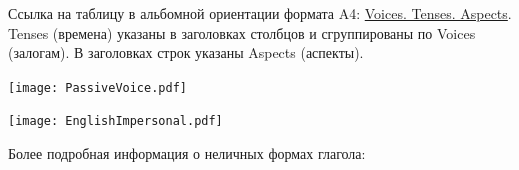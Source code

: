 \documentclass[main.tex]{subfiles}
\begin{document}
Ссылка на таблицу в альбомной ориентации формата A4: \href{https://mualal.github.io/asp/english/EnglishTensesAspectsVoicesPoster.pdf}{Voices. Tenses. Aspects}.
Tenses (времена) указаны в заголовках столбцов и сгруппированы по Voices (залогам).
В заголовках строк указаны Aspects (аспекты).


{\parindent-10pt\texttt{[image: PassiveVoice.pdf]}}\newpage

\label{subsec:impersonal-lk}

{\parindent0pt\texttt{[image: EnglishImpersonal.pdf]}}

Более подробная информация о неличных формах глагола: \hyperref[subsec:impersonal-forms-full-view]{\color{blue}{НЕЛИЧНЫЕ ФОРМЫ ГЛАГОЛА}}
\end{document}
